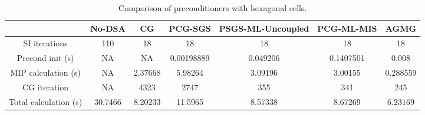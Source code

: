 \begin{table}[H]
\begin{center}
\begin{tabular}{|c|c|c|c|c|c|c|}
\hline
 & No-DSA & CG & PCG-SGS & PSGS-ML-Uncoupled & PCG-ML-MIS & AGMG\\
\hline
SI iterations & 110 & 18 & 18 & 18 & 18 & 18\\
Precond init (s) & NA & NA &  0.00198889 & 0.049206 & 0.1407501 & 0.008\\
MIP calculation (s) & NA & 2.37668 & 5.98264 & 3.09196 & 3.00155 & 0.288559\\
CG iteration & NA & 4323 & 2747 & 355 & 341 & 245\\
Total calculation (s) & 30.7466 & 8.20233 & 11.5965 & 8.57338 & 8.67269 &
6.23169\\
\hline
\end{tabular}
\caption{Comparison of preconditioners with hexagonal cells.}
\end{center}
\end{table}
